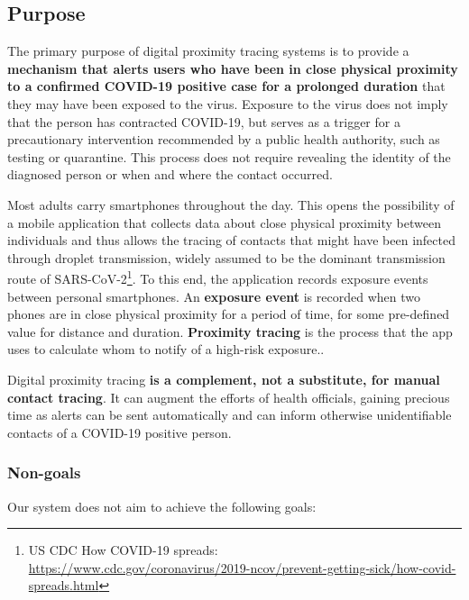 \documentclass{article}
\begin{document}
\subsection{Purpose}\label{purpose}

The primary purpose of digital proximity tracing systems is to provide a
\textbf{mechanism that alerts users who have been in close physical
proximity to a confirmed COVID-19 positive case for a prolonged
duration} that they may have been exposed to the virus. Exposure to the
virus does not imply that the person has contracted COVID-19, but serves
as a trigger for a precautionary intervention recommended by a public
health authority, such as testing or quarantine. This process does not
require revealing the identity of the diagnosed person or when and where
the contact occurred.

Most adults carry smartphones throughout the day. This opens the
possibility of a mobile application that collects data about close
physical proximity between individuals and thus allows the tracing of
contacts that might have been infected through droplet transmission,
widely assumed to be the dominant transmission route of
SARS-CoV-2\footnote{US CDC How COVID-19 spreads:\\
  \url{https://www.cdc.gov/coronavirus/2019-ncov/prevent-getting-sick/how-covid-spreads.html}}.
To this end, the application records exposure events between personal
smartphones. An \textbf{exposure event} is recorded when two phones are
in close physical proximity for a period of time, for some pre-defined
value for distance and duration. \textbf{Proximity tracing} is the
process that the app uses to calculate whom to notify of a high-risk
exposure..

Digital proximity tracing \textbf{is a complement, not a substitute, for
manual contact tracing}. It can augment the efforts of health officials,
gaining precious time as alerts can be sent automatically and can inform
otherwise unidentifiable contacts of a COVID-19 positive person.

\subsubsection*{Non-goals}\label{non-goals}

Our system does not aim to achieve the following goals:
\end{document}
